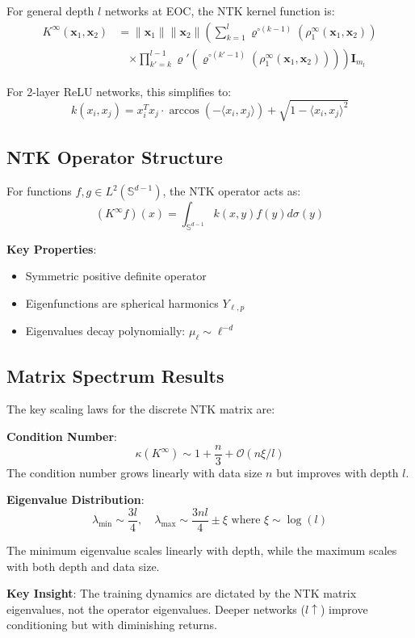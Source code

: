 \documentclass{article}
\begin{document}
For general depth $l$ networks at EOC, the NTK kernel function is:
\begin{align}
K^{\infty}(\mathbf{x}_1, \mathbf{x}_2) &= \|\mathbf{x}_1\| \|\mathbf{x}_2\| \left( \sum_{k=1}^l \varrho^{\circ (k-1)}\left(\rho_1^{\infty}(\mathbf{x}_1, \mathbf{x}_2)\right) \right. \\
&\quad \left. \times \prod_{k'=k}^{l-1} \varrho'\left(\varrho^{\circ (k'-1)}\left(\rho_1^{\infty}(\mathbf{x}_1, \mathbf{x}_2)\right)\right) \right) \mathbf{I}_{m_l}
\end{align}

For 2-layer ReLU networks, this simplifies to:
\[
k(x_i,x_j) = x_i^T x_j \cdot \arccos(-\langle x_i,x_j \rangle) + \sqrt{1-\langle x_i,x_j \rangle^2}
\]

\subsection{NTK Operator Structure}

For functions $f,g \in L^2(\mathbb{S}^{d-1})$, the NTK operator acts as:
\[
(K^{\infty} f)(x) = \int_{\mathbb{S}^{d-1}} k(x,y)f(y)d\sigma(y)
\]

\textbf{Key Properties}:
\begin{itemize}
\item Symmetric positive definite operator
\item Eigenfunctions are spherical harmonics $Y_{\ell,p}$
\item Eigenvalues decay polynomially: $\mu_\ell \sim \ell^{-d}$
\end{itemize}

\subsection{Matrix Spectrum Results}

The key scaling laws for the discrete NTK matrix are:

\textbf{Condition Number}:
\[ \kappa(K^{\infty}) \sim 1 + \frac{n}{3} + \mathcal{O}(n \xi / l) \]
The condition number grows linearly with data size $n$ but improves with depth $l$.

\textbf{Eigenvalue Distribution}:
\[ \lambda_{\text{min}} \sim \frac{3l}{4}, \quad \lambda_{\text{max}} \sim \frac{3nl}{4} \pm \xi \text{ where } \xi \sim \log(l) \]

The minimum eigenvalue scales linearly with depth, while the maximum scales with both depth and data size.

\textbf{Key Insight}: The training dynamics are dictated by the NTK matrix eigenvalues, not the operator eigenvalues. Deeper networks ($l \uparrow$) improve conditioning but with diminishing returns.
\end{document}
